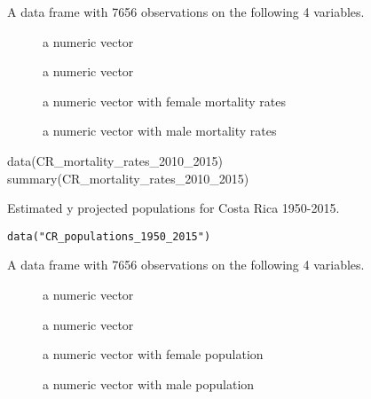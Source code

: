 \documentclass[a4paper]{book}
\begin{document}
%
\begin{Format}
A data frame with 7656 observations on the following 4 variables.
\begin{description}

\item[] a numeric vector
\item[] a numeric vector
\item[] a numeric vector with female mortality rates
\item[] a numeric vector with male mortality rates

\end{description}

\end{Format}
%
\begin{Source}\relax
{}
\end{Source}
%
\begin{Examples}
\begin{ExampleCode}
data(CR_mortality_rates_2010_2015)
summary(CR_mortality_rates_2010_2015)
\end{ExampleCode}
\end{Examples}
%
\begin{Description}\relax
Estimated y projected populations for Costa Rica 1950-2015.
\end{Description}
%
\begin{Usage}
\begin{verbatim}
data("CR_populations_1950_2015")
\end{verbatim}
\end{Usage}
%
\begin{Format}
A data frame with 7656 observations on the following 4 variables.
\begin{description}

\item[] a numeric vector
\item[] a numeric vector
\item[] a numeric vector with female population
\item[] a numeric vector with male population

\end{description}

\end{Format}
\end{document}
